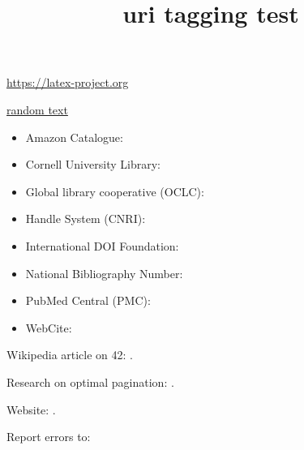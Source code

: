 \documentclass{article}
\title{uri tagging test}
\begin{document}
\url{https://latex-project.org} %

\href{https://latex-project.org}{random text} %

\begin{itemize}
\item Amazon Catalogue:             \hfill {}
\item Cornell University Library:   \hfill {}
\item Global library cooperative (OCLC):   \hfill {}
\item Handle System (CNRI):         \hfill {}
\item International DOI Foundation: \hfill {}
\item National Bibliography Number: \hfill {}
\item PubMed Central (PMC):         \hfill {}
\item WebCite:                      \hfill {}
\end{itemize}



Wikipedia article on 42:        .

Research on optimal pagination: .

Website:          .

Report errors to:          
\end{document}
